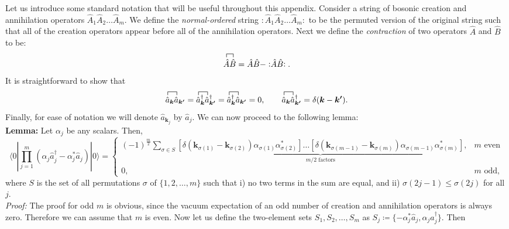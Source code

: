 \documentclass[pra,nofootinbib,floats,aps,twocolumn,tightenlines,superscriptaddress]{revtex4-1}
\newcommand{\ket}[1]{| {#1} \rangle}
\newcommand{\bra}[1]{\langle {#1} |}
\renewcommand{\a}[1]{\hat{a}_{\bm{#1}}}
\newcommand{\ad}[1]{\hat{a}_{\bm{#1}}^\dagger}
\newcommand{\an}[1]{\hat{a}_{#1}}
\newcommand{\adn}[1]{\hat{a}_{#1}^\dagger}
\newcommand{\ah}{\hat{a}}
\newcommand{\normord}[1]{:\mathrel{#1}:}
\begin{document}
Let us introduce some standard notation that will be useful throughout this appendix. Consider a string of bosonic creation and annihilation operators $\hat{A}_1\hat{A}_2\dots\hat{A}_m$. We define the \textit{normal-ordered} string $\normord{\hat{A}_1\hat{A}_2\dots\hat{A}_m}$ to be the permuted version of the original string such that all of the creation operators appear before all of the annihilation operators. Next we define the \textit{contraction} of two operators $\hat{A}$ and $\hat{B}$ to be:
\begin{equation}
    \contraction{}{\hat{A}}{}{
    \hat{B}}
    \hat{A}\hat{B}
    =
    \hat{A}\hat{B}-
    \normord{\hat{A}\hat{B}}.
\end{equation}
It is straightforward to show that
\begin{equation}
\label{eq:contractions1}
    \contraction{}{\ah}{{}_{\bm{k}}}{\ah}
    \a{k}\a{k'}
    =
    \contraction{}{\ah}{{}_{\bm{k}}^\dagger}{\ah}
    \ad{k}\ad{k'}
    =
    \contraction{}{\ah}{{}_{\bm{k}}^\dagger}{\ah}
    \ad{k}\a{k'}
    =
    0,
    \qquad
    \contraction{}{\ah}{{}_{\bm{k}}}{\ah}
    \a{k}\ad{k'}
    =
    \delta(\bm{k}-\bm{k'}).
\end{equation}
Finally, for ease of notation we will denote $\an{\bm{k}_j}$ by $\an{j}$. We can now proceed to the following lemma:
\vspace{2mm}
\\
\textbf{Lemma:} Let $\alpha_j$ be any scalars. Then,
\begin{equation}
    \bra{0}
    \prod_{j=1}^m
    \left(\alpha_j\adn{j}
    -\alpha_j^*\an{j}\right)
    \ket{0}
    =
    \begin{cases}
    (-1)^\frac{m}{2}\!\!
    \sum\limits_{\sigma\in S} 
    \underbrace{
    \left[\delta(\bm{k}_{\sigma(1)}-
    \bm{k}_{\sigma(2)})
    \alpha_{\sigma(1)}
    \alpha_{\sigma(2)}^*
    \right]
    \ldots
    \left[\delta(\bm{k}_{\sigma(m-1)}-
    \bm{k}_{\sigma(m)})
    \alpha_{\sigma(m-1)}
    \alpha_{\sigma(m)}^*
    \right]}_{m/2 \text{ factors}},& \!m \text{ even}
    \\
    0,& \!m \text{ odd},
    \end{cases}
\end{equation}
where $S$ is the set of all permutations $\sigma$ of $\{1,2,\ldots,m\}$ such that i) no two terms in the sum are equal, and ii) $\sigma(2j-1)\le\sigma(2j)$ for all $j$.
\\
\textit{Proof:} The proof for odd $m$ is obvious, since the vacuum expectation of an odd number of creation and annihilation operators is always zero. Therefore we can assume that $m$ is even. Now let us define the two-element sets $S_1, S_2, \ldots, S_m$ as \mbox{$S_j\coloneqq\{-\alpha_j^*\an{j},\alpha_j\adn{j}\}$}. Then
\end{document}
